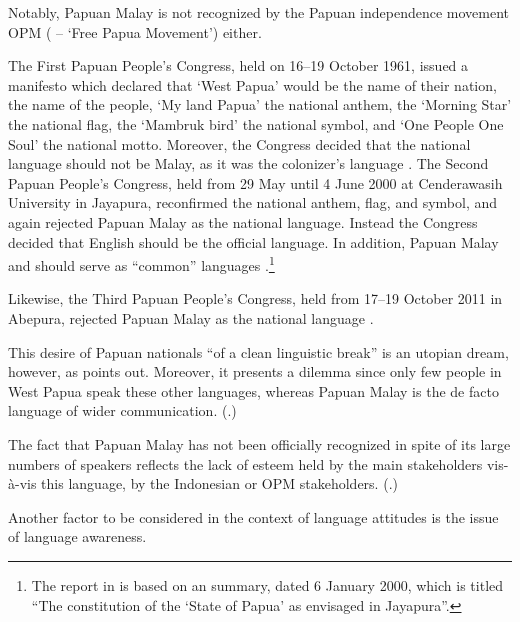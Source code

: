 Notably, Papuan Malay is not recognized by the Papuan independence movement OPM ( – ‘Free Papua Movement’) either.


The First Papuan People’s Congress, held on 16--19 October 1961, issued a manifesto which declared that  ‘West Papua’ would be the name of their nation,  the name of the people,  ‘My land Papua’ the national anthem, the  ‘Morning Star’ the national flag, the  ‘Mambruk bird’ the national symbol, and  ‘One People One Soul’ the national motto. Moreover, the Congress decided that the national language should not be Malay, as it was the colonizer’s language \citep[40--43]{Alua.2006}. The Second Papuan People’s Congress, held from 29 May until 4 June 2000 at Cenderawasih University in Jayapura, reconfirmed the national anthem, flag, and symbol, and again rejected Papuan Malay as the national language. Instead the Congress decided that English should be the official language. In addition, Papuan Malay and  should serve as  ``common'' languages \citep[50]{King.2004}.\footnote{The report in \cite{King.2004} is based on an  summary, dated 6 January 2000, which is titled  ``The constitution of the ‘State of Papua’ as envisaged in Jayapura''.}

Likewise, the Third Papuan People’s Congress, held from 17--19 October 2011 in Abepura, rejected Papuan Malay as the national language \citep[19]{Besier.2012}.


\largerpage
This desire of Papuan nationals  ``of a clean linguistic break'' is an utopian dream, however, as {\citet[407]{Rutherford.2005}} points out. Moreover, it presents a dilemma since only few people in West Papua speak these other languages, whereas Papuan Malay is the de facto language of wider communication. (\citealt[See also][17--22]{Besier.2012}.)



The fact that Papuan Malay has not been officially recognized in spite of its large numbers of speakers reflects the lack of esteem held by the main stakeholders vis-à-vis this language, by the Indonesian or OPM stakeholders. (\citealt[See also][-32]{Besier.2012}.)



Another factor to be considered in the context of language attitudes is the issue of language awareness.



